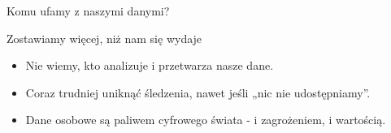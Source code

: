     \begin{frame}{Komu ufamy z naszymi danymi?}
    \begin{alertblock}{Zostawiamy więcej, niż nam się wydaje}
        \begin{itemize}
          \item Nie wiemy, kto analizuje i przetwarza nasze dane.
          \item Coraz trudniej uniknąć śledzenia, nawet jeśli „nic nie udostępniamy”.
          \item Dane osobowe są paliwem cyfrowego świata - i zagrożeniem, i wartością.
        \end{itemize}
    \end{alertblock}
    \end{frame}
